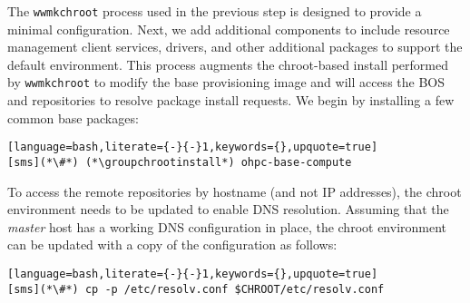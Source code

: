 The \texttt{wwmkchroot} process used in the previous step is designed to
provide a minimal \baseOS{} configuration. Next, we add additional components
to include resource management client services, \InfiniBand{} drivers, and
other additional packages to support the default \OHPC{} environment. This
process augments the chroot-based install performed by \texttt{wwmkchroot} to
modify the base provisioning image and will access the BOS and \OHPC{}
repositories to resolve package install requests. We begin by installing a few
common base packages:

\begin{lstlisting}[language=bash,literate={-}{-}1,keywords={},upquote=true]
[sms](*\#*) (*\groupchrootinstall*) ohpc-base-compute
\end{lstlisting}

To access the remote
repositories by hostname (and not IP addresses), the chroot environment needs
to be updated to enable DNS resolution. Assuming that the {\em master} host has
a working DNS configuration in place, the chroot environment can be updated
with a copy of the configuration as follows:

\begin{lstlisting}[language=bash,literate={-}{-}1,keywords={},upquote=true]
[sms](*\#*) cp -p /etc/resolv.conf $CHROOT/etc/resolv.conf
\end{lstlisting}
